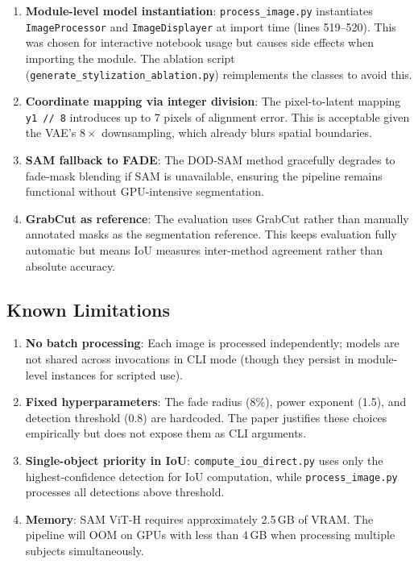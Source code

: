 \documentclass[11pt,a4paper]{article}
\begin{document}
\begin{enumerate}
  \item \textbf{Module-level model instantiation}: \texttt{process\_image.py} instantiates \texttt{ImageProcessor} and \texttt{ImageDisplayer} at import time (lines 519--520). This was chosen for interactive notebook usage but causes side effects when importing the module. The ablation script (\texttt{generate\_stylization\_ablation.py}) reimplements the classes to avoid this.

  \item \textbf{Coordinate mapping via integer division}: The pixel-to-latent mapping \texttt{y1 // 8} introduces up to 7 pixels of alignment error. This is acceptable given the VAE's $8\times$ downsampling, which already blurs spatial boundaries.

  \item \textbf{SAM fallback to FADE}: The DOD-SAM method gracefully degrades to fade-mask blending if SAM is unavailable, ensuring the pipeline remains functional without GPU-intensive segmentation.

  \item \textbf{GrabCut as reference}: The evaluation uses GrabCut rather than manually annotated masks as the segmentation reference. This keeps evaluation fully automatic but means IoU measures inter-method agreement rather than absolute accuracy.
\end{enumerate}

\subsection{Known Limitations}

\begin{enumerate}
  \item \textbf{No batch processing}: Each image is processed independently; models are not shared across invocations in CLI mode (though they persist in module-level instances for scripted use).

  \item \textbf{Fixed hyperparameters}: The fade radius (8\%), power exponent (1.5), and detection threshold (0.8) are hardcoded. The paper justifies these choices empirically but does not expose them as CLI arguments.

  \item \textbf{Single-object priority in IoU}: \texttt{compute\_iou\_direct.py} uses only the highest-confidence detection for IoU computation, while \texttt{process\_image.py} processes all detections above threshold.

  \item \textbf{Memory}: SAM ViT-H requires approximately 2.5\,GB of VRAM. The pipeline will OOM on GPUs with less than 4\,GB when processing multiple subjects simultaneously.
\end{enumerate}
\end{document}
